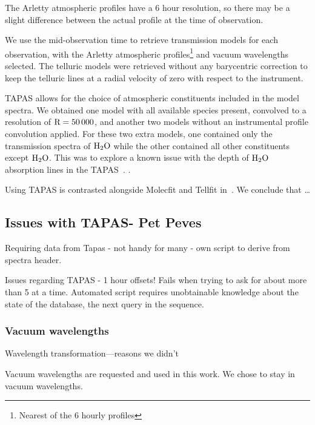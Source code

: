 The Arletty atmospheric profiles have a 6 hour resolution, so there may be a slight difference between the actual profile at the time of observation.

We use the mid-observation time to retrieve transmission models for each observation, with the Arletty atmospheric profiles\footnote{Nearest of the 6 hourly profiles} and vacuum wavelengths selected. The telluric models were retrieved without any barycentric correction to keep the telluric lines at a radial velocity of zero with respect to the instrument. 

TAPAS allows for the choice of atmospheric constituents included in the model spectra. We obtained one model with all available species present, convolved to a resolution of \(\rm R=50\,000 \), and another two models without an instrumental profile convolution applied. For these two extra models, one contained only the transmission spectra of \(\rm H_{2}O \) while the other contained all other constituents except \(\rm H_{2}O \). This was to explore a known issue with the depth of \(\rm H_{2}O \) absorption lines in the TAPAS~\citet{bertaux_tapas_2014}. .



Using TAPAS is contrasted alongside Molecfit and Tellfit in~\cite{ulmer-moll_telluric_2018}. We conclude that \ldots

\subsection{Issues with TAPAS-  Pet Peves}
Requiring data from Tapas
- not handy for many
- own script to derive from spectra header.

Issues regarding TAPAS - 1 hour offsets!
Fails when trying to ask for about more than 5 at a time.
Automated script requires unobtainable knowledge about the state of the database, the next query in the sequence. 


\subsubsection{Vacuum wavelengths}

Wavelength transformation---reasons we didn't

Vacuum wavelengths are requested and used in this work.
We chose to stay in vacuum wavelengths.  

